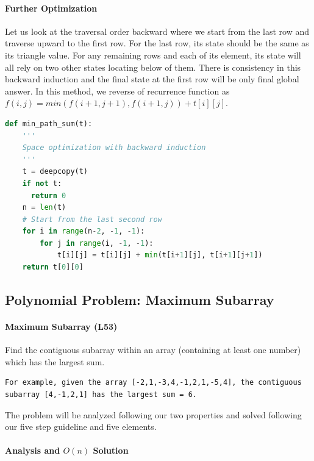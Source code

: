 \documentclass[../main.tex]{subfiles}
\begin{document}
\paragraph{Further Optimization} Let us look at the traversal order backward where we start from the last row and traverse upward to the first row. For the last row, its state should be the same as its triangle value. For any remaining rows and each of its element, its state will all rely on two other states locating below of them. There is consistency in this backward induction and the final state at the first row will be only final global answer.  In this method, we reverse of recurrence function as $f(i,j)=min(f(i+1, j+1), f(i+1, j))+t[i][j]$.
\begin{lstlisting}[language = Python]
def min_path_sum(t):
    '''
    Space optimization with backward induction
    '''
    t = deepcopy(t)
    if not t:
      return 0
    n = len(t)
    # Start from the last second row
    for i in range(n-2, -1, -1):
        for j in range(i, -1, -1):
            t[i][j] = t[i][j] + min(t[i+1][j], t[i+1][j+1])
    return t[0][0]
\end{lstlisting}


\subsection{Polynomial Problem: Maximum Subarray}

\paragraph{Maximum Subarray (L53)} Find the contiguous subarray within an array (containing at least one number) which has the largest sum. 
\begin{lstlisting}[numbers=none]
For example, given the array [-2,1,-3,4,-1,2,1,-5,4], the contiguous subarray [4,-1,2,1] has the largest sum = 6.
\end{lstlisting}

The problem will be analyzed following our two properties and solved following our five step guideline and five elements. 
\paragraph{Analysis and $O(n)$ Solution}
\end{document}
